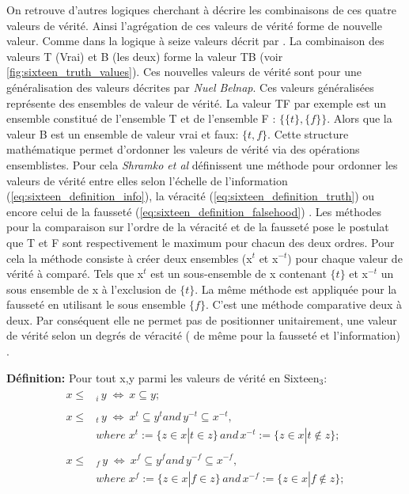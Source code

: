 \begin{refsegment}
    On retrouve d'autres logiques cherchant à décrire les combinaisons de ces quatre valeurs de vérité. Ainsi l'agrégation de ces valeurs de vérité forme de nouvelle valeur. Comme dans la logique à seize valeurs décrit par \citeauthor{shramko2005some} \cite{shramko2005some,shramko2011truth,shramko2006hyper}. La combinaison des valeurs T (Vrai) et B (les deux) forme la valeur TB (voir \cref{fig:sixteen_truth_values}). Ces nouvelles valeurs de vérité sont pour \citeauthor{shramko2005some} une généralisation des valeurs décrites par \textit{Nuel Belnap}. Ces valeurs généralisées représente des ensembles de valeur de vérité. La valeur TF par exemple est un ensemble constitué de l'ensemble T et de l'ensemble F : $\{\{t\},\{f\}\}$. Alors que la valeur B est un ensemble de valeur vrai et faux: $\{t,f\}$. Cette structure mathématique permet d'ordonner les valeurs de vérité via des opérations ensemblistes. Pour cela \textit{Shramko et al} définissent une méthode pour ordonner les valeurs de vérité entre elles selon l'échelle de l'information (\ref{eq:sixteen_definition_info}), la véracité (\ref{eq:sixteen_definition_truth}) ou encore celui de la fausseté (\ref{eq:sixteen_definition_falsehood}) . Les méthodes pour la comparaison sur l'ordre de la véracité et de la fausseté pose le postulat que T et F sont respectivement le maximum pour chacun des deux ordres. Pour cela la méthode consiste à créer deux ensembles (x$^{t}$ et x$^{-t}$) pour chaque valeur de vérité à comparé. Tels que x$^{t}$ est un sous-ensemble de x contenant $\{t\}$ et x$^{-t}$ un sous ensemble de x à l'exclusion de $\{t\}$. La même méthode est appliquée pour la fausseté en utilisant le sous ensemble $\{f\}$.  C'est une méthode comparative deux à deux. Par conséquent elle ne permet pas de positionner unitairement, une valeur de vérité selon un degrés de véracité ( de même pour la fausseté et l'information) .
    
    \textbf{Définition:} Pour tout x,y parmi les valeurs de vérité en Sixteen$_{3}$:\nolisttopbreak \vspace{-0.5cm}
    \begin{align}
        \begin{split}
        x \leq& _{i} \, y \; \iff \: x \subseteq y\label{eq:sixteen_definition_info};
        \end{split}\\ \begin{split}\label{eq:sixteen_definition_truth}
        x \leq& _{t} \, y \; \iff \: x^{t} \subseteq y^{t} and \, y^{-t} \subseteq x^{-t},\\
              &where \; x^{t} := \{z \in x | t \in z \} \, and \, x^{-t} := \{z \in x | t \notin z \};
        \end{split}\\ \begin{split}\label{eq:sixteen_definition_falsehood}
        x \leq& _{f} \, y \; \iff \: x^{f} \subseteq y^{f} and \, y^{-f} \subseteq x^{-f},\\
              &where \; x^{f} := \{z \in x | f \in z \} \, and \, x^{-f} := \{z \in x | f \notin z \};
        \end{split}
    \end{align}
    

\end{refsegment}
